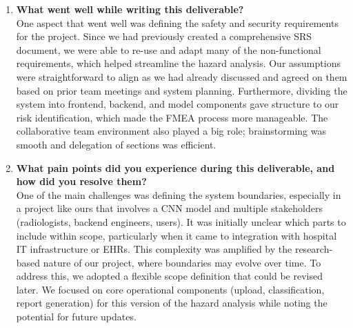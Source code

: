 \documentclass{article}
\begin{document}
\begin{enumerate}
  \item \textbf{What went well while writing this deliverable?}\\
  One aspect that went well was defining the safety and security requirements for the project.
  Since we had previously created a comprehensive SRS document, we were able to re-use and adapt many of the non-functional requirements, which helped streamline the hazard analysis. Our assumptions were straightforward to align as we had already discussed and agreed on them based on prior team meetings and system planning. Furthermore, dividing the system into frontend, backend, and model components gave structure to our risk identification, which made the FMEA process more manageable. The collaborative team environment also played a big role; brainstorming was smooth and delegation of sections was efficient.

  \item \textbf{What pain points did you experience during this deliverable, and how did you resolve them?}\\
  One of the main challenges was defining the system boundaries, especially in a project like ours that involves a CNN model and multiple stakeholders (radiologists, backend engineers, users). It was initially unclear which parts to include within scope, particularly when it came to integration with hospital IT infrastructure or EHRs. This complexity was amplified by the research-based nature of our project, where boundaries may evolve over time. To address this, we adopted a flexible scope definition that could be revised later. We focused on core operational components (upload, classification, report generation) for this version of the hazard analysis while noting the potential for future updates.


\end{enumerate}
\end{document}
